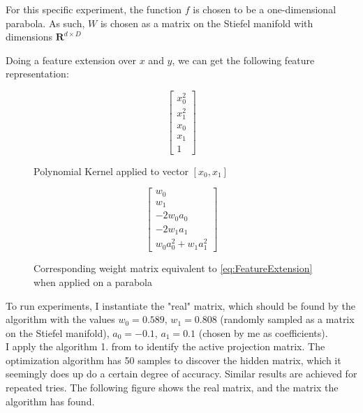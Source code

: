 For this specific experiment, the function $f$ is chosen to be a one-dimensional parabola. 
As such, $W$ is chosen as a matrix on the Stiefel manifold with dimensions $\mathbf{R}^{d \times D}$

Doing a feature extension over $x$ and $y$, we can get the following feature representation:

\def\PHI{
\begin{bmatrix}
	x_0^2 \\
	x_1^2 \\
	x_0 \\
	x_1 \\
    1
\end{bmatrix}}


\def\WtoPhi{
\begin{bmatrix}
	w_0 \\
    w_1 \\
	-2 w_0 a_0 \\
	-2 w_1 a_1 \\
	w_0 a_0^2 + w_1 a_1^2
\end{bmatrix}}

\begin{figure}[h]

\begin {minipage}{0.47\textwidth}
  \centering
  \begin{equation}
    \PHI
  \end{equation}
  \caption{Polynomial Kernel applied to vector $[x_0, x_1]$}
\end{minipage}
\hfill
\begin {minipage}{0.47\textwidth}
  \centering
  \begin{equation}
    \WtoPhi
  \end{equation}
  \caption{Corresponding weight matrix equivalent to \ref{eq:FeatureExtension} when applied on a parabola}
\end{minipage}

\end{figure}

To run experiments, I instantiate the "real" matrix, which should be found by the algorithm with the values $w_0 = 0.589$, $w_1 = 0.808$ (randomly sampled as a matrix on the Stiefel manifold), $a_0 = -0.1$, $a_1 = 0.1$ (chosen by me as coefficients). \\

I apply the algorithm 1. from \citep{Tripathy} to identify the active projection matrix.
The optimization algorithm has 50 samples to discover the hidden matrix, which it seemingly does up do a certain degree of accuracy.
Similar results are achieved for repeated tries.
The following figure shows the real matrix, and the matrix the algorithm has found.

